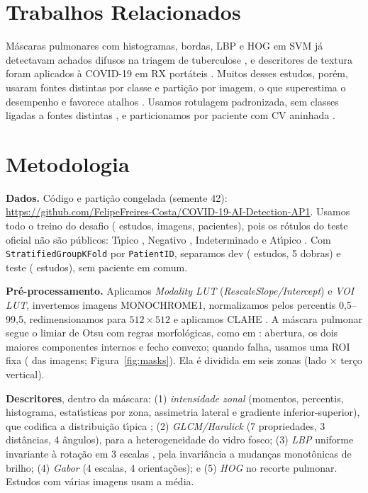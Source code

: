 \documentclass[12pt]{article}
\begin{document}
\section{Trabalhos Relacionados}

M\'ascaras pulmonares com histogramas, bordas, LBP e HOG em SVM j\'a detectavam achados
difusos na triagem de tuberculose \cite{jaeger2014tb}, e descritores de textura foram
aplicados \`a COVID-19 em RX port\'ateis \cite{hussain2020texture}. Muitos desses estudos,
por\'em, usaram fontes distintas por classe e parti\c{c}\~ao por imagem, o que superestima o
desempenho \cite{roberts2021pitfalls} e favorece atalhos \cite{degrave2021shortcuts}. Usamos
rotulagem padronizada, sem classes ligadas a fontes distintas
\cite{lakhani2023siim}, e particionamos por paciente com CV aninhada \cite{varma2006bias}.

\section{Metodologia}

\textbf{Dados.} C\'odigo e parti\c{c}\~ao congelada (semente 42): \url{https://github.com/FelipeFreires-Costa/COVID-19-AI-Detection-AP1}. Usamos todo o treino do desafio (\NStudies{} estudos, \NImages{} imagens,
\NPatients{} pacientes), pois os r\'otulos do teste oficial n\~ao s\~ao p\'ublicos: T\'{\i}pico
\PctTyp{}, Negativo \PctNeg{}, Indeterminado \PctInd{} e At\'{\i}pico \PctAty{}. Com
\texttt{StratifiedGroupKFold} por \texttt{PatientID}, separamos dev (\NDev{} estudos,
5 dobras) e teste (\NTest{} estudos), sem paciente em comum.

\textbf{Pr\'e-processamento.} Aplicamos \emph{Modality LUT} (\emph{RescaleSlope/Intercept}) e
\emph{VOI LUT}, invertemos imagens MONOCHROME1, normalizamos pelos percentis 0,5--99,5,
redimensionamos para $512\times512$ e aplicamos CLAHE \cite{zuiderveld1994clahe}. A m\'ascara
pulmonar segue o limiar de Otsu \cite{otsu1979} com regras morfol\'ogicas, como em \cite{jaeger2014tb}: abertura, os dois maiores componentes internos e fecho
convexo; quando falha, usamos uma ROI fixa (\MaskFallback{} das imagens; Figura~\ref{fig:masks}). Ela \'e dividida
em seis zonas (lado $\times$ ter\c{c}o vertical).

\textbf{Descritores}, dentro da m\'ascara: (1) \emph{intensidade zonal} (momentos, percentis,
histograma, estat\'{\i}sticas por zona, assimetria lateral e gradiente inferior-superior), que
codifica a distribui\c{c}\~ao t\'{\i}pica \cite{wong2020frequency}; (2) \emph{GLCM/Haralick}
\cite{haralick1973} (7 propriedades, 3 dist\^ancias, 4 \^angulos), para a heterogeneidade do
vidro fosco; (3) \emph{LBP} uniforme invariante \`a rota\c{c}\~ao em 3 escalas
\cite{ojala2002lbp}, pela invari\^ancia a mudan\c{c}as monot\^onicas de brilho; (4) \emph{Gabor}
\cite{jain1991gabor} (4 escalas, 4 orienta\c{c}\~oes); e (5) \emph{HOG} \cite{dalal2005hog} no
recorte pulmonar. Estudos com v\'arias imagens usam a m\'edia.
\end{document}
